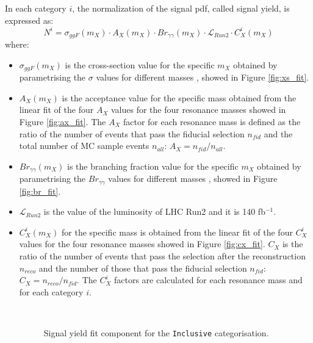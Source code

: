 \documentclass[a4paper, oneside, 11pt, openright]{book}
\begin{document}
 				
 				In each category $i$, the normalization of the signal pdf, called signal yield, is expressed as:
 				\begin{equation}\label{eq:signal_yield}
 					N^i = \sigma_{ggF}(m_X) \cdot A_X(m_X) \cdot Br_{\gamma\gamma}(m_X) \cdot \mathcal{L}_{Run2} \cdot C_X^i(m_X)
 				\end{equation}
 				where:
 				\begin{itemize}
 					\item $\sigma_{ggF}(m_X)$ is the cross-section value for the specific $m_X$ obtained by parametrising the $\sigma$ values for different masses \cite{yellow4}, showed in Figure \ref{fig:xs_fit}.
 					\item $A_X(m_X)$ is the acceptance value for the specific mass obtained from the linear fit of the four $A_X$ values for the four resonance masses showed in Figure \ref{fig:ax_fit}. The $A_X$ factor for each resonance mass is defined as the ratio of the number of events that pass the fiducial selection $n_{fid}$ and the total number of MC sample events $n_{all}$: $A_X = n_{fid}/n_{all}$.
 					\item $Br_{\gamma\gamma}(m_X)$ is the branching fraction value for the specific $m_X$ obtained by parametrising the $Br_{\gamma\gamma}$ values for different masses \cite{yellow3}, showed in Figure \ref{fig:br_fit}.  
 					\item $\mathcal{L}_{Run2}$ is the value of the luminosity of LHC Run2 and it is 140 fb$^{-1}$.
 					\item $C_X^i(m_X)$ for the specific mass is obtained from the linear fit of the four $C_X^i$ values for the four resonance masses showed in Figure \ref{fig:cx_fit}. $C_X$ is the ratio of the number of events that pass the selection after the reconstruction $n_{reco}$ and the number of those that pass the fiducial selection $n_{fid}$: $C_X = n_{reco}/n_{fid}$. The $C_X^i$ factors are calculated for each resonance mass and for each category $i$.
 				
 					\begin{figure}[h!]
 						\centering
 						\\
 						\caption{Signal yield fit component for the \texttt{Inclusive} categorisation.}
 						\label{fig:signal_yiels}
 					\end{figure}
 				\end{itemize}
 				
\end{document}
